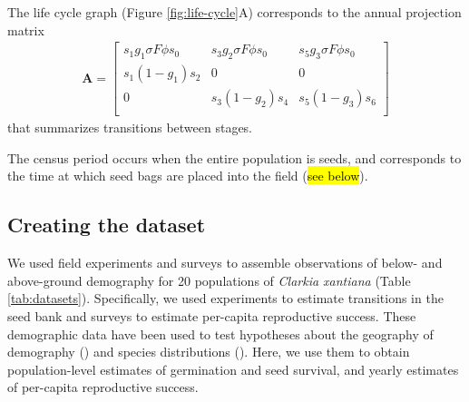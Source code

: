 \documentclass[12pt, oneside, titlepage]{article}   	%
\begin{document}
{The life cycle graph (Figure \ref{fig:life-cycle}A) corresponds to the annual projection matrix
%
\begin{gather}
\bm{A} = 
\begin{bmatrix} 
s_1 g_1 \sigma F \phi s_0 & s_3 g_2 \sigma F \phi s_0 & s_5 g_3 \sigma F \phi s_0 \\
s_1 (1-g_1) s_2 & 0 & 0 \\
0 & s_3 (1-g_2) s_4  & s_5 (1-g_3) s_6  \\
\end{bmatrix}
\label{eq:projection-matrix}
\end{gather} 
%
that summarizes transitions between stages. 

The census period occurs when the entire population is seeds, and corresponds to the time at which seed bags are placed into the field (\hl{see below}).
\fi

\subsection{Creating the dataset}

We used field experiments and surveys to assemble observations of below- and above-ground demography for 20 populations of \textit{Clarkia xantiana} (Table \ref{tab:datasets}). Specifically, we used experiments to estimate transitions in the seed bank and surveys to estimate per-capita reproductive success. These demographic data have been used to test hypotheses about the geography of demography (\cite{eckhart2011}) and species distributions (\cite{pironon2018}). Here, we use them to obtain population-level estimates of germination and seed survival, and yearly estimates of per-capita reproductive success.

}
\end{document}

